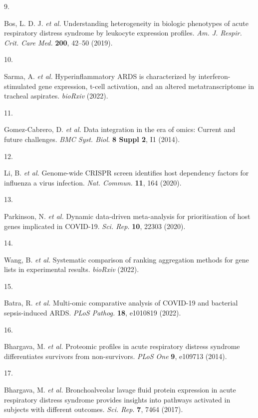 \documentclass[
  11,
  a4paper,
]{article}
\newlength{\cslhangindent}
\newlength{\csllabelwidth}
\newlength{\cslentryspacingunit} %
\newenvironment{CSLReferences}[2] %
 {%
  \setlength{\parindent}{0pt}
  \ifodd #1
  \let\oldpar\par
  \def\par{\hangindent=\cslhangindent\oldpar}
  \fi
  \setlength{\parskip}{#2\cslentryspacingunit}
 }%
 {}
\newcommand{\CSLLeftMargin}[1]{\parbox[t]{\csllabelwidth}{#1}}
\newcommand{\CSLRightInline}[1]{\parbox[t]{\linewidth - \csllabelwidth}{#1}\break}
\begin{document}
\begin{CSLReferences}{0}{0}
\leavevmode{}%
\CSLLeftMargin{9. }%
\CSLRightInline{Bos, L. D. J. \emph{et al.} Understanding heterogeneity
in biologic phenotypes of acute respiratory distress syndrome by
leukocyte expression profiles. \emph{Am. J. Respir. Crit. Care Med.}
\textbf{200}, 42--50 (2019).}

\leavevmode{}%
\CSLLeftMargin{10. }%
\CSLRightInline{Sarma, A. \emph{et al.} Hyperinflammatory {ARDS} is
characterized by interferon-stimulated gene expression, t-cell
activation, and an altered metatranscriptome in tracheal aspirates.
\emph{bioRxiv} (2022).}

\leavevmode{}%
\CSLLeftMargin{11. }%
\CSLRightInline{Gomez-Cabrero, D. \emph{et al.} Data integration in the
era of omics: Current and future challenges. \emph{BMC Syst. Biol.}
\textbf{8 Suppl 2}, I1 (2014).}

\leavevmode{}%
\CSLLeftMargin{12. }%
\CSLRightInline{Li, B. \emph{et al.} Genome-wide {CRISPR} screen
identifies host dependency factors for influenza a virus infection.
\emph{Nat. Commun.} \textbf{11}, 164 (2020).}

\leavevmode{}%
\CSLLeftMargin{13. }%
\CSLRightInline{Parkinson, N. \emph{et al.} Dynamic data-driven
meta-analysis for prioritisation of host genes implicated in {COVID-19}.
\emph{Sci. Rep.} \textbf{10}, 22303 (2020).}

\leavevmode{}%
\CSLLeftMargin{14. }%
\CSLRightInline{Wang, B. \emph{et al.} Systematic comparison of ranking
aggregation methods for gene lists in experimental results.
\emph{bioRxiv} (2022).}

\leavevmode{}%
\CSLLeftMargin{15. }%
\CSLRightInline{Batra, R. \emph{et al.} Multi-omic comparative analysis
of {COVID-19} and bacterial sepsis-induced {ARDS}. \emph{PLoS Pathog.}
\textbf{18}, e1010819 (2022).}

\leavevmode{}%
\CSLLeftMargin{16. }%
\CSLRightInline{Bhargava, M. \emph{et al.} Proteomic profiles in acute
respiratory distress syndrome differentiates survivors from
non-survivors. \emph{PLoS One} \textbf{9}, e109713 (2014).}

\leavevmode{}%
\CSLLeftMargin{17. }%
\CSLRightInline{Bhargava, M. \emph{et al.} Bronchoalveolar lavage fluid
protein expression in acute respiratory distress syndrome provides
insights into pathways activated in subjects with different outcomes.
\emph{Sci. Rep.} \textbf{7}, 7464 (2017).}


\end{CSLReferences}
\end{document}
